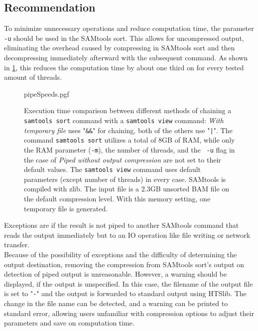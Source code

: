 \subsection{Recommendation}
To minimize unnecessary operations and reduce computation time, the parameter \texttt{-u} should be used in the SAMtools sort. This allows for uncompressed output, eliminating the overhead caused by compressing in SAMtools sort and then decompressing immediately afterward with the subsequent command. As shown in \ref{fig:pipeSpeeds}, this reduces the computation time by about one third on for every tested amount of threads.\\
\begin{figure}
        {pipeSpeeds.pgf}
    \caption{Execution time comparison between different methods of chaining a \texttt{samtools sort} command with a \texttt{samtools view} command: \textit{With temporary file} uses "\texttt{\&\&}" for chaining, both of the others use "\texttt{|}". The command \texttt{samtools sort} utilizes a total of 8GB of RAM, while only the RAM parameter (\texttt{-m}), the number of threads, and the \texttt{ -u} flag in the case of \textit{Piped without output compression} are not set to their default values.
    The \texttt{samtools view} command uses default parameters (except number of threads) in every case. SAMtools is compiled with zlib. The input file is a 2.3GB unsorted BAM file on the default compression level. With this memory setting, one temporary file is generated.
    }
    \label{fig:pipeSpeeds}
\end{figure}
Exceptions are if the result is not piped to another SAMtools command that reads the output immediately but to an IO operation like  file writing or network transfer. \\
Because of the possibility of exceptions and the difficulty of determining the output destination, removing the compression from SAMtools sort's output on detection of piped output is unreasonable. However, a warning should be displayed, if the output is unspecified. In this case, the filename of the output file is set to "\texttt{-}" and the output is forwarded to standard output using HTSlib. The change in the file name can be detected, and a warning can be printed to standard error, allowing users unfamiliar with compression options to adjust their parameters and save on computation time.





